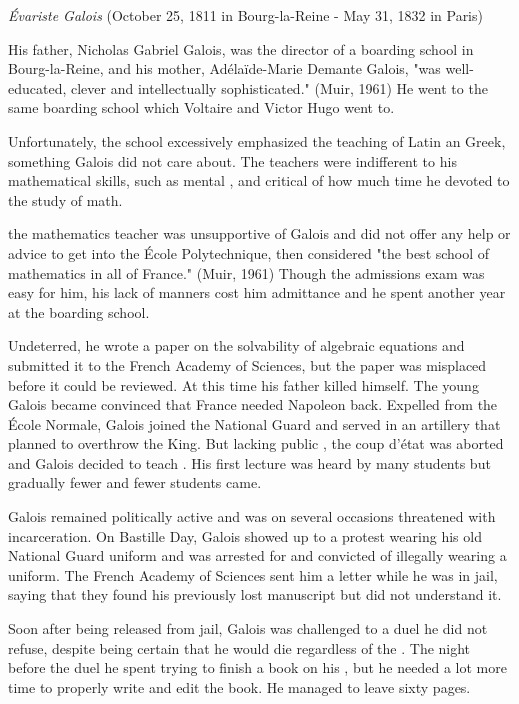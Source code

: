 \documentclass[12pt]{article}
\begin{document}
{\em \'Evariste Galois} (October 25, 1811 in Bourg-la-Reine - May 31, 1832 in Paris)

His father, Nicholas Gabriel Galois, was the director of a boarding school in Bourg-la-Reine, and his mother, Ad\'{e}la\"{i}de-Marie Demante Galois, "was well-educated, clever and intellectually sophisticated." (Muir, 1961) He went to the same boarding school which Voltaire and Victor Hugo went to.

Unfortunately, the school excessively emphasized the teaching of Latin an Greek, something Galois did not care about. The teachers were indifferent to his mathematical skills, such as mental , and critical of how much time he devoted to the study of math.

 the mathematics teacher was unsupportive of Galois and did not offer any help or advice to get into the \'Ecole Polytechnique, then considered "the best school of mathematics in all of France." (Muir, 1961) Though the admissions exam was easy for him, his lack of manners cost him admittance and he spent another year at the boarding school.

Undeterred, he wrote a paper on the solvability of algebraic equations and submitted it to the French Academy of Sciences, but the paper was misplaced before it could be reviewed. At this time his father killed himself. The young Galois became convinced that France needed Napoleon back. Expelled from the \'Ecole Normale, Galois joined the National Guard and served in an artillery  that planned to overthrow the King. But lacking public , the coup d'\'{e}tat was aborted and Galois decided to teach . His first lecture was heard by many students but gradually fewer and fewer students came.

Galois remained politically active and was on several occasions threatened with incarceration. On Bastille Day, Galois showed up to a protest wearing his old National Guard uniform and was arrested for and convicted of illegally wearing a uniform. The French Academy of Sciences sent him a letter while he was in jail, saying that they found his previously lost manuscript but did not understand it.

Soon after being released from jail, Galois was challenged to a duel he did not refuse, despite being certain that he would die regardless of the . The night before the duel he spent trying to finish a book on his , but he needed a lot more time to properly write and edit the book. He managed to leave sixty pages.
\end{document}
